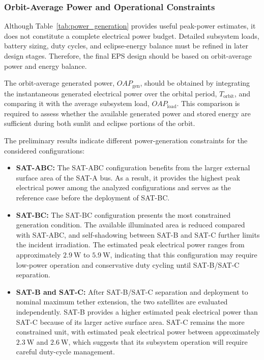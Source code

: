 \subsubsection{Orbit-Average Power and Operational Constraints}
\label{subsub:eps_oap_operational_constraints}

Although Table~\ref{tab:power_generation} provides useful peak-power estimates, it does not constitute a complete electrical power budget. Detailed subsystem loads, battery sizing, duty cycles, and eclipse-energy balance must be refined in later design stages. Therefore, the final EPS design should be based on orbit-average power and energy balance.

The orbit-average generated power, \(OAP_{\mathrm{gen}}\), should be obtained by integrating the instantaneous generated electrical power over the orbital period, \(T_{\mathrm{orbit}}\), and comparing it with the average subsystem load, \(OAP_{\mathrm{load}}\). This comparison is required to assess whether the available generated power and stored energy are sufficient during both sunlit and eclipse portions of the orbit.

The preliminary results indicate different power-generation constraints for the considered configurations:

\begin{itemize}
    \item \textbf{SAT-ABC:} The SAT-ABC configuration benefits from the larger external surface area of the SAT-A bus. As a result, it provides the highest peak electrical power among the analyzed configurations and serves as the reference case before the deployment of SAT-BC.

    \item \textbf{SAT-BC:} The SAT-BC configuration presents the most constrained generation condition. The available illuminated area is reduced compared with SAT-ABC, and self-shadowing between SAT-B and SAT-C further limits the incident irradiation. The estimated peak electrical power ranges from approximately \(2.9~\mathrm{W}\) to \(5.9~\mathrm{W}\), indicating that this configuration may require low-power operation and conservative duty cycling until SAT-B/SAT-C separation.

    \item \textbf{SAT-B and SAT-C:} After SAT-B/SAT-C separation and deployment to nominal maximum tether extension, the two satellites are evaluated independently. SAT-B provides a higher estimated peak electrical power than SAT-C because of its larger active surface area. SAT-C remains the more constrained unit, with estimated peak electrical power between approximately \(2.3~\mathrm{W}\) and \(2.6~\mathrm{W}\), which suggests that its subsystem operation will require careful duty-cycle management.
\end{itemize}

